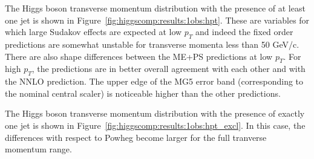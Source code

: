 The Higgs boson transverse momentum distribution with the presence of
at least one jet is shown in
Figure~\ref{fig:higgscomp:results:1obs:hpt}. These are variables for
which large Sudakov effects are expected at low $p_T$ and indeed the
fixed order predictions are somewhat unstable for transverse momenta
less than 50 GeV/c. There are also shape differences between the ME+PS
predictions at low $p_T$. For high $p_T$, the predictions are in
better overall agreement with each other and with the NNLO
prediction. The upper edge of the MG5 error band (corresponding to the
nominal central scaler) is noticeable higher than the other
predictions.

The Higgs boson transverse momentum distribution with the presence of
exactly one jet is shown in
Figure~\ref{fig:higgscomp:results:1obs:hpt_excl}. In this case, the
differences with respect to Powheg become larger for the full
tranverse momentum range.


